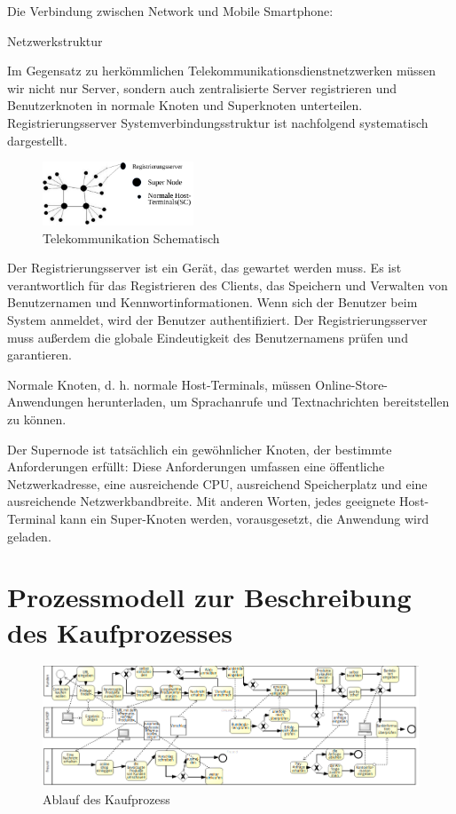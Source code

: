 Die Verbindung zwischen Network und Mobile Smartphone:

Netzwerkstruktur

Im Gegensatz zu herkömmlichen Telekommunikationsdienstnetzwerken müssen wir nicht nur Server, sondern auch zentralisierte Server registrieren und Benutzerknoten in normale Knoten und Superknoten unterteilen. Registrierungsserver Systemverbindungsstruktur ist nachfolgend systematisch dargestellt.

\begin{figure}[htbp]
	\centering
	\includegraphics[width=0.4\textwidth]{bilder/telekommunikation-schema.png}
	\caption{Telekommunikation Schematisch}
	\label{fig:telekommunikation}
\end{figure}

Der Registrierungsserver ist ein Gerät, das gewartet werden muss. Es ist verantwortlich für das Registrieren des Clients, das Speichern und Verwalten von Benutzernamen und Kennwortinformationen. Wenn sich der Benutzer beim System anmeldet, wird der Benutzer authentifiziert. Der Registrierungsserver muss außerdem die globale Eindeutigkeit des Benutzernamens prüfen und garantieren.

Normale Knoten, d. h. normale Host-Terminals, müssen Online-Store-Anwendungen herunterladen, um Sprachanrufe und Textnachrichten bereitstellen zu können.

Der Supernode ist tatsächlich ein gewöhnlicher Knoten, der bestimmte Anforderungen erfüllt: Diese Anforderungen umfassen eine öffentliche Netzwerkadresse, eine ausreichende CPU, ausreichend Speicherplatz und eine ausreichende Netzwerkbandbreite. Mit anderen Worten, jedes geeignete Host-Terminal kann ein Super-Knoten werden, vorausgesetzt, die Anwendung wird geladen.


\section{Prozessmodell zur Beschreibung des Kaufprozesses}

\begin{figure}[htbp]
	\centering
	\includegraphics[width=1\textwidth]{bilder/bpmn-ablauf-kaufen.png}
	\caption{Ablauf des Kaufprozess}
	\label{fig:bpmn-ablauf-kaufen}
\end{figure}


